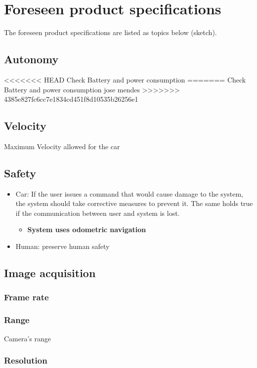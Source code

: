 \section{Foreseen product specifications}
\label{sec:org31f7574}
The foreseen product specifications are listed as topics below (sketch).

\subsection{Autonomy}
<<<<<<< HEAD
\label{sec:orge975868}
Check Battery and power consumption
=======
\label{sec:org7364ba5}
Check Battery and power consumption jose mendes
>>>>>>> 4385e827fc6cc7e1834cd451f8d10535b26256e1
\subsection{Velocity}
\label{sec:org08718bc}
Maximum Velocity allowed for the car
\subsection{Safety}
\label{sec:org83942c3}
\begin{itemize}
\item Car: If the user issues a command that would cause damage to the system, the
system should take corrective measures to prevent it. The same holds true if
the communication between user and system is lost.
\begin{itemize}
\item \textbf{System uses odometric navigation}
\end{itemize}
\item Human: preserve human safety
\end{itemize}
\subsection{Image acquisition}
\label{sec:orgb6a5f66}
\subsubsection{Frame rate}
\label{sec:org5adf4ee}
\subsubsection{Range}
\label{sec:orgecb044c}
Camera's range
\subsubsection{Resolution}
\label{sec:orgba87554}
